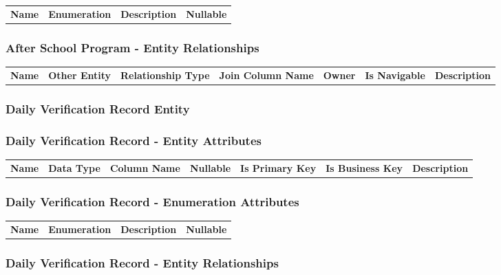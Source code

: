 \begin{tabular}{lcp{6.0cm}c}
\bfseries Name & \bfseries Enumeration & \bfseries Description & \bfseries Nullable \\
\end{tabular}

\subsubsection*{ After School Program - Entity Relationships}

\begin{tabular}{llllllp{2.0cm}}
\bfseries Name & \bfseries Other Entity & \bfseries Relationship Type & \bfseries Join Column Name & \bfseries Owner & \bfseries Is Navigable & \bfseries Description\\
\end{tabular}


\subsubsection{ Daily Verification Record Entity }

\subsubsection*{ Daily Verification Record - Entity Attributes }

\begin{tabular}{lllcccl}
\bfseries Name & \bfseries Data Type & \bfseries Column Name & \bfseries Nullable & \bfseries Is Primary Key & \bfseries Is Business Key & \bfseries Description\\
\end{tabular}

\subsubsection*{ Daily Verification Record - Enumeration Attributes}

\begin{tabular}{lcp{6.0cm}c}
\bfseries Name & \bfseries Enumeration & \bfseries Description & \bfseries Nullable \\
\end{tabular}

\subsubsection*{ Daily Verification Record - Entity Relationships}

